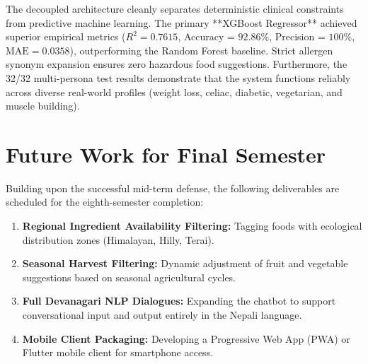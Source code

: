 \documentclass[12pt,a4paper]{report}
\begin{document}
The decoupled architecture cleanly separates deterministic clinical constraints from predictive machine learning. The primary **XGBoost Regressor** achieved superior empirical metrics ($R^2 = 0.7615$, Accuracy = $92.86\%$, Precision = $100\%$, $\text{MAE} = 0.0358$), outperforming the Random Forest baseline. Strict allergen synonym expansion ensures zero hazardous food suggestions. Furthermore, the 32/32 multi-persona test results demonstrate that the system functions reliably across diverse real-world profiles (weight loss, celiac, diabetic, vegetarian, and muscle building).

\section{Future Work for Final Semester}

Building upon the successful mid-term defense, the following deliverables are scheduled for the eighth-semester completion:
\begin{enumerate}[leftmargin=*]
  \item \textbf{Regional Ingredient Availability Filtering:} Tagging foods with ecological distribution zones (Himalayan, Hilly, Terai).
  \item \textbf{Seasonal Harvest Filtering:} Dynamic adjustment of fruit and vegetable suggestions based on seasonal agricultural cycles.
  \item \textbf{Full Devanagari NLP Dialogues:} Expanding the chatbot to support conversational input and output entirely in the Nepali language.
  \item \textbf{Mobile Client Packaging:} Developing a Progressive Web App (PWA) or Flutter mobile client for smartphone access.
\end{enumerate}
\end{document}
